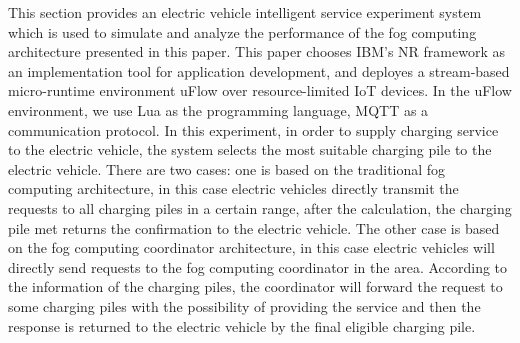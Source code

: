 \documentclass[conference]{IEEEtran}
\begin{document}
This section provides an electric vehicle intelligent service experiment system which is used to simulate and analyze the performance of the fog computing architecture presented in this paper. This paper chooses IBM's NR framework as an implementation tool for application development, and deployes a stream-based micro-runtime environment uFlow over resource-limited IoT devices. In the uFlow environment, we use Lua as the programming language, MQTT as a communication protocol. 
In this experiment, in order to supply charging service to the electric vehicle, the system selects the most suitable charging pile to the electric vehicle. There are two cases: one is based on the traditional fog computing architecture, in this case electric vehicles directly transmit the requests to all charging piles in a certain range, after the calculation, the charging pile met returns the confirmation to the electric vehicle. The other case is based on the fog computing coordinator architecture, in this case electric vehicles will directly send requests to the fog computing coordinator in the area. According to the information of the charging piles, the coordinator will forward the request to some charging piles with the possibility of providing the service and then the response is returned to the electric vehicle by the final eligible charging pile.
\end{document}
